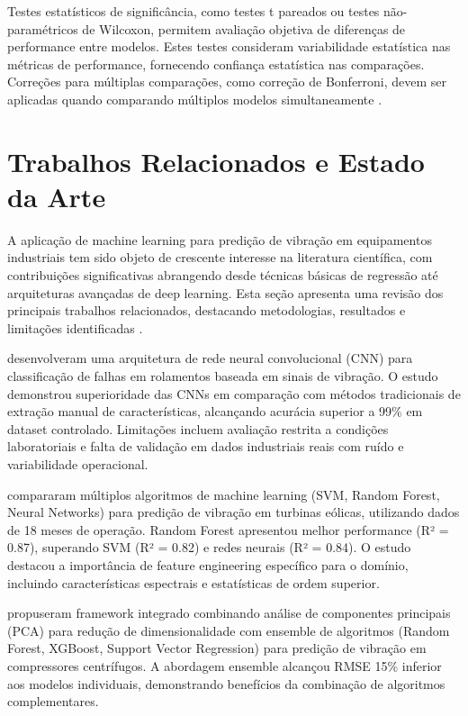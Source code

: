 Testes estatísticos de significância, como testes t pareados ou testes não-paramétricos de Wilcoxon, permitem avaliação objetiva de diferenças de performance entre modelos. Estes testes consideram variabilidade estatística nas métricas de performance, fornecendo confiança estatística nas comparações. Correções para múltiplas comparações, como correção de Bonferroni, devem ser aplicadas quando comparando múltiplos modelos simultaneamente \cite{demsar2006statistical}.

\section{Trabalhos Relacionados e Estado da Arte}
\label{sec:trabalhos-relacionados}

A aplicação de machine learning para predição de vibração em equipamentos industriais tem sido objeto de crescente interesse na literatura científica, com contribuições significativas abrangendo desde técnicas básicas de regressão até arquiteturas avançadas de deep learning. Esta seção apresenta uma revisão dos principais trabalhos relacionados, destacando metodologias, resultados e limitações identificadas \cite{lei2020applications}.

 desenvolveram uma arquitetura de rede neural convolucional (CNN) para classificação de falhas em rolamentos baseada em sinais de vibração. O estudo demonstrou superioridade das CNNs em comparação com métodos tradicionais de extração manual de características, alcançando acurácia superior a 99\% em dataset controlado. Limitações incluem avaliação restrita a condições laboratoriais e falta de validação em dados industriais reais com ruído e variabilidade operacional.

 compararam múltiplos algoritmos de machine learning (SVM, Random Forest, Neural Networks) para predição de vibração em turbinas eólicas, utilizando dados de 18 meses de operação. Random Forest apresentou melhor performance (R² = 0.87), superando SVM (R² = 0.82) e redes neurais (R² = 0.84). O estudo destacou a importância de feature engineering específico para o domínio, incluindo características espectrais e estatísticas de ordem superior.

 propuseram framework integrado combinando análise de componentes principais (PCA) para redução de dimensionalidade com ensemble de algoritmos (Random Forest, XGBoost, Support Vector Regression) para predição de vibração em compressores centrífugos. A abordagem ensemble alcançou RMSE 15\% inferior aos modelos individuais, demonstrando benefícios da combinação de algoritmos complementares.

